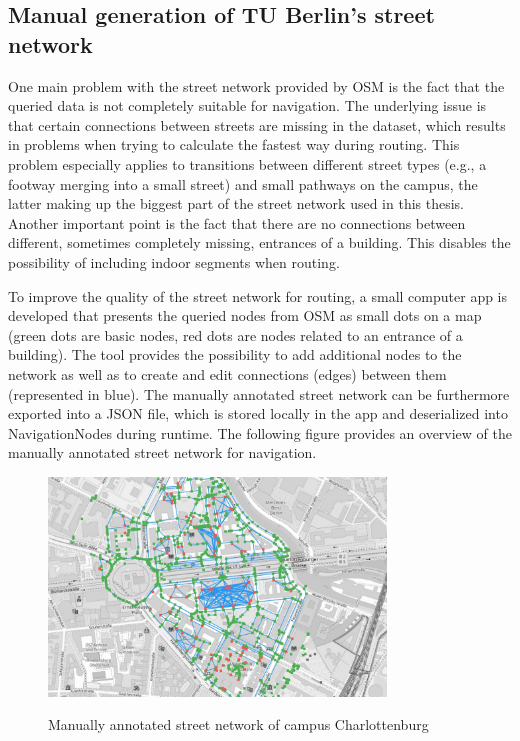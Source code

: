 \subsection{Manual generation of TU Berlin's street network}
One main problem with the street network provided by OSM is the fact that the queried data is not completely suitable for navigation. The underlying issue is that certain connections between streets are missing in the dataset, which results in problems when trying to calculate the fastest way during routing. This problem especially applies to transitions between different street types (e.g., a footway merging into a small street) and small pathways on the campus, the latter making up the biggest part of the street network used in this thesis. Another important point is the fact that there are no connections between different, sometimes completely missing, entrances of a building. This disables the possibility of including indoor segments when routing.

To improve the quality of the street network for routing, a small computer app is developed that presents the queried nodes from OSM as small dots on a map (green dots are basic nodes, red dots are nodes related to an entrance of a building). The tool provides the possibility to add additional nodes to the network as well as to create and edit connections (edges) between them (represented in blue). The manually annotated street network can be furthermore exported into a JSON file, which is stored locally in the app and deserialized into NavigationNodes during runtime. The following figure provides an overview of the manually annotated street network for navigation.

\begin{figure}[H]
	\centering
	\includegraphics[width=0.8\textwidth]{images/street_network_for_navigation.jpeg}\\
	\caption{Manually annotated street network of campus Charlottenburg}
\end{figure}

